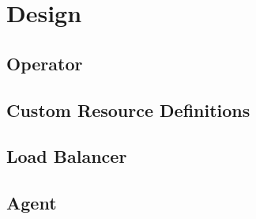 \chapter{Design}

\section{Operator}

\section{Custom Resource Definitions}

\section{Load Balancer}

\section{Agent}
